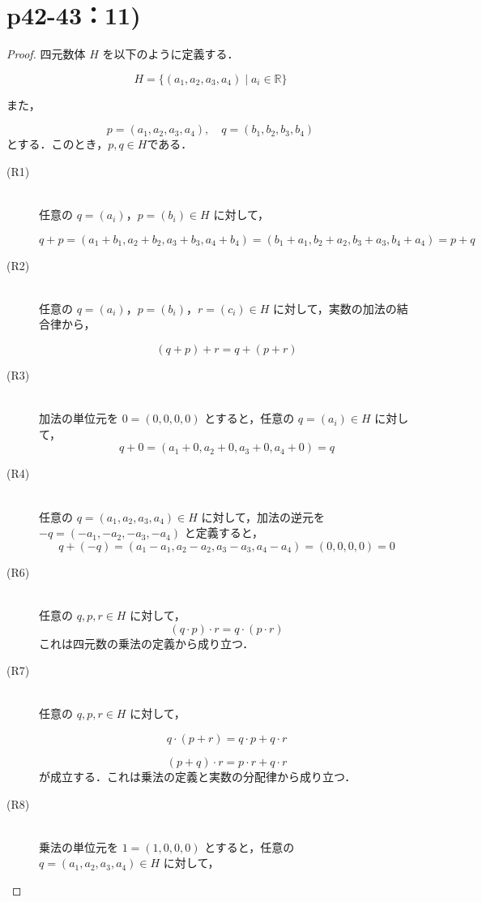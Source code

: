 \documentclass[a4paper,10pt,fleqn]{ltjsarticle}
\begin{document}
\newpage 

\section*{p42-43：11)}

\begin{leftbar}
\begin{proof}
四元数体 $H$ を以下のように定義する．

\[
H = \{ (a_1, a_2, a_3, a_4) \mid a_i \in \mathbb{R}\}
\]

また，

\[
p=(a_1, a_2, a_3, a_4),\quad q=(b_1, b_2, b_3, b_4)
\]
とする．このとき，$ p ,q \in H$である．
\begin{description}
\item [(R1)] \mbox{} \\
    任意の $q = (a_i)$，$p = (b_i) \in H$ に対して，
    
    \[
    q + p = (a_1 + b_1, a_2 + b_2, a_3 + b_3, a_4 + b_4) = (b_1 + a_1, b_2 + a_2, b_3 + a_3, b_4 + a_4) = p + q
    \]
\item [(R2)] \mbox{} \\
任意の $q = (a_i)$，$p = (b_i)$，$r = (c_i) \in H$ に対して，実数の加法の結合律から，

\[
(q + p) + r = q + (p + r)
\]
\item [(R3)] \mbox{} \\
加法の単位元を $0 = (0, 0, 0, 0)$ とすると，任意の $q = (a_i) \in H$ に対して，
\[
q + 0 = (a_1 + 0, a_2 + 0, a_3 + 0, a_4 + 0) = q
\]

\item [(R4)] \mbox{} \\
任意の $q = (a_1, a_2, a_3, a_4) \in H$ に対して，加法の逆元を $-q = (-a_1, -a_2, -a_3, -a_4)$ と定義すると，
\[
q + (-q) = (a_1 - a_1, a_2 - a_2, a_3 - a_3, a_4 - a_4) = (0, 0, 0, 0) = 0
\]
\item [(R6)] \mbox{} \\
任意の $q, p, r \in H$ に対して，
\[
(q \cdot p) \cdot r = q \cdot (p \cdot r)
\]
これは四元数の乗法の定義から成り立つ．
\item[(R7)] \mbox{} \\
任意の $q, p, r \in H$ に対して，

\[
q \cdot (p + r) = q \cdot p + q \cdot r
\]

\[
(p + q) \cdot r = p \cdot r + q \cdot r
\]
が成立する．これは乗法の定義と実数の分配律から成り立つ．
\item [(R8)] \mbox{} \\
乗法の単位元を $1 = (1, 0, 0, 0)$ とすると，任意の $q = (a_1, a_2, a_3, a_4) \in H$ に対して，


\end{description}
\end{proof}
\end{leftbar}
\end{document}
